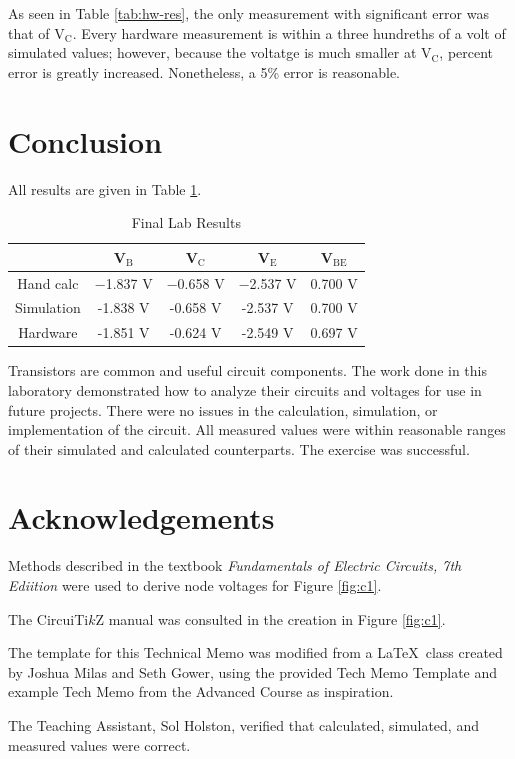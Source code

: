 \documentclass[EEEE]{KGCOEReport}
\begin{document}
As seen in Table \ref{tab:hw-res}, the only measurement with significant error
was that of V$_\text{C}$. Every hardware measurement is within a three
hundreths of a volt of simulated values; however, because the voltatge is much
smaller at V$_\text{C}$, percent error is greatly increased. Nonetheless, a
5\% error is reasonable.

\section{Conclusion}

All results are given in Table \ref{tab:res}.

\begin{table}[H]
	\center
	\caption{Final Lab Results}
	\begin{tabular}{|c|c|c|c|c|}
		\hline
		           & V$_\text{B}$ & V$_\text{C}$ & V$_\text{E}$ & V$_\text{BE}$ \\
		\hline
		\hline
		Hand calc  & −1.837 V     & −0.658 V     & −2.537 V     & 0.700 V       \\
		\hline
		Simulation & -1.838 V     & -0.658 V     & -2.537 V     & 0.700 V       \\
		\hline
		Hardware   & -1.851 V     & -0.624 V     & -2.549 V     & 0.697 V       \\
		\hline
	\end{tabular}
	\label{tab:res}
\end{table}

Transistors are common and useful circuit components. The work done in this
laboratory demonstrated how to analyze their circuits and voltages for use in
future projects. There were no issues in the calculation, simulation, or
implementation of the circuit. All measured values were within reasonable
ranges of their simulated and calculated counterparts. The exercise was
successful.

\section{Acknowledgements}

Methods described in the textbook \textit{Fundamentals of Electric Circuits,
	7th Ediition} \cite{fec} were used to derive node voltages for Figure
\ref{fig:c1}.

The CircuiTi$k$Z \cite{ctz} manual was consulted in the creation in Figure
\ref{fig:c1}.

The template for this Technical Memo was modified from a \LaTeX \ class created
by Joshua Milas and Seth Gower, using the provided Tech Memo Template and
example Tech Memo from the Advanced Course as inspiration.

The Teaching Assistant, Sol Holston, verified that calculated, simulated, and
measured values were correct.

\printbibliography
\end{document}
